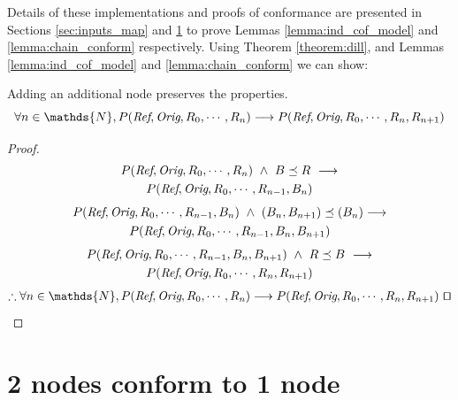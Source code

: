 \documentclass[runningheads]{llncs}
\newenvironment{manualtheorem}[1]{%
  \renewcommand\themanualtheoreminner{#1}%
  \manualtheoreminner
}{\endmanualtheoreminner}
\begin{document}
Details of these implementations and proofs of conformance are presented in Sections \ref{sec:inputs_map} and \ref{chap:coq_results} to prove 
Lemmas \ref{lemma:ind_cof_model} and \ref{lemma:chain_conform} respectively.
Using Theorem \ref{theorem:dill}, and Lemmas \ref{lemma:ind_cof_model} and \ref{lemma:chain_conform} we can show:

\begin{manualtheorem}{\ref{lemma:inductive_step}}[Inductive Step]
Adding an additional node preserves the properties.
$$
\forall n \in \mathds{N}, P(\emph{Ref}, \emph{Orig}, R_0, \dotsm, R_n) \longrightarrow P(\emph{Ref}, \emph{Orig}, R_0, \dotsm, R_n, R_{n+1})
$$
\begin{proof}\ \\
    \vspace*{-20pt}
    \begin{multline*}
    P(\emph{Ref}, \emph{Orig}, R_0, \dotsm, R_n)\ \wedge\  B \preceq R\ \longrightarrow \\
    P(\emph{Ref}, \emph{Orig}, R_0, \dotsm, R_{n-1}, B_n)
    \end{multline*}
    \vspace*{-25pt}
    \begin{multline*}
    P(\emph{Ref}, \emph{Orig}, R_0, \dotsm, R_{n-1}, B_n)\ \wedge\  (B_n, B_{n+1}) \preceq (B_n)
 \longrightarrow 
    \\    
    P(\emph{Ref}, \emph{Orig}, R_0, \dotsm, R_{n-1}, B_n, B_{n+1})
    \end{multline*}
    \vspace*{-25pt}
    \begin{multline*}
    P(\emph{Ref}, \emph{Orig}, R_0, \dotsm, R_{n-1}, B_n, B_{n+1})\ \wedge\ R \preceq B\ \longrightarrow
    \\
    P(\emph{Ref}, \emph{Orig}, R_0, \dotsm, R_n, R_{n+1})
    \end{multline*}
    \vspace*{-25pt}
    \begin{multline*}
    \therefore  \forall n \in \mathds{N}, P(\emph{Ref}, \emph{Orig}, R_0, \dotsm, R_n) \longrightarrow P(\emph{Ref}, \emph{Orig}, R_0, \dotsm, R_n, R_{n+1})\ \qed
    \end{multline*}
\end{proof}
\end{manualtheorem}

\section{2 nodes conform to 1 node}
\label{chap:coq_results}
\end{document}
